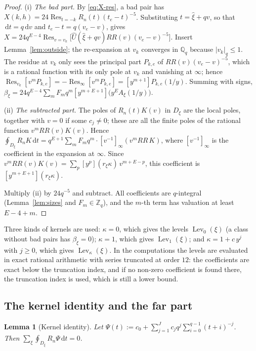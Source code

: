 \documentclass{amsart}
\newtheorem{lemma}[theorem]{Lemma}
\theoremstyle{definition}
\theoremstyle{remark}
\numberwithin{equation}{section}
\newcommand{\Z}{\mathbb{Z}}
\newcommand{\Q}{\mathbb{Q}}
\newcommand{\Res}{\operatorname{Res}}
\newcommand{\Lev}{\operatorname{Lev}}
\newcommand{\dd}{\,\mathrm{d}}
\begin{document}
\begin{proof}
(i) \emph{The bad part.} By \eqref{eq:X-res}, a bad pair has
$X(k,h)=24\Res_{t=-k}R_n(t)(t_e-t)^{-5}$. Substituting $t=\hat\xi+qv$, so that
$\dd t=q\dd v$ and $t_e-t=q(v_e-v)$, gives
$X=24q^{E-4}\Res_{v=v_k}\bigl[\hat U(\hat\xi+qv)RR(v)(v_e-v)^{-5}\bigr]$.
Insert Lemma~\ref{lem:outside}; the re-expansion at $v_k$ converges in $\Q_q$
because $|v_k|_q\le1$. The residue at $v_k$ only sees the principal part
$P_{k,e}$ of $RR(v)(v_e-v)^{-5}$, which is a rational function with its only
pole at $v_k$ and vanishing at $\infty$; hence
$\Res_{v_k}[v^mP_{k,e}]=-\Res_\infty[v^mP_{k,e}]=[y^{m+1}]P_{k,e}(1/y)$.
Summing with signs,
$\beta_\xi=24q^{E-4}\sum_mF_mq^m[y^{m+E+1}]\bigl(y^EA_\xi(1/y)\bigr)$.

(ii) \emph{The subtracted part.} The poles of $R_n(t)K(v)$ in $D_\xi$ are the
local poles, together with $v=0$ if some $c_j\ne0$; these are all the finite
poles of the rational function $v^mRR(v)K(v)$. Hence
$\oint_{D_\xi}R_nK\dd t=q^{E+1}\sum_mF_mq^m\cdot[v^{-1}]_\infty(v^mRR\,K)$,
where $[v^{-1}]_\infty$ is the coefficient in the expansion at $\infty$. Since
$v^mRR(v)K(v)=\sum_p[y^p](r_\xi\kappa)\,v^{m+E-p}$, this coefficient is
$[y^{m+E+1}](r_\xi\kappa)$.

Multiply (ii) by $24q^{-5}$ and subtract. All coefficients are $q$-integral
(Lemma~\ref{lem:sizes} and $F_m\in\Z_q$), and the $m$-th term has valuation at
least $E-4+m$.
\end{proof}

Three kinds of kernels are used: $\kappa=0$, which gives the levels
$\Lev_0(\xi)$ (a class without bad pairs has $\beta_\xi=0$); $\kappa=1$,
which gives $\Lev_1(\xi)$; and $\kappa=1+c\,y^j$ with $j\ge0$, which gives
$\Lev_\kappa(\xi)$. In the computations the levels are evaluated in exact
rational arithmetic with series truncated at order $12$: the coefficients are
exact below the truncation index, and if no non-zero coefficient is found
there, the truncation index is used, which is still a lower bound.

\subsection{The kernel identity and the far part}\label{ss:kernel}

\begin{lemma}[Kernel identity]\label{lem:kernel}
Let $\Psi(t):=c_0+\sum_{j=1}^{J}c_jq^j\sum_{i=0}^{q-1}(t+i)^{-j}$. Then
$\sum_\xi\oint_{D_\xi}R_n\Psi\dd t=0$.
\end{lemma}
\end{document}
